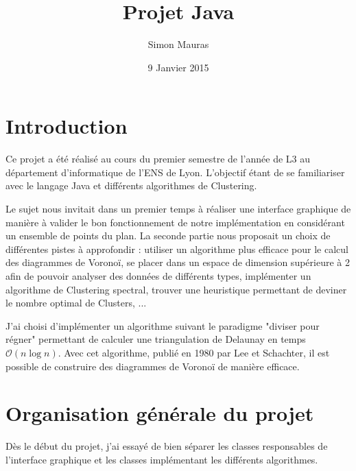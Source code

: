\documentclass[a4paper]{article}
\title{Projet Java}
\author{Simon Mauras}
\date{9 Janvier 2015}
\begin{document}
  
  \maketitle
  
  \tableofcontents

  \section{Introduction}
  
  Ce projet a été réalisé au cours du premier semestre de l'année de L3 au département d'informatique de l'ENS de Lyon. L'objectif étant de se familiariser avec le langage Java et différents algorithmes de Clustering.

Le sujet nous invitait dans un premier temps à réaliser une interface graphique de manière à valider le bon fonctionnement de notre implémentation en considérant un ensemble de points du plan. La seconde partie nous proposait un choix de différentes pistes à approfondir : utiliser un algorithme plus efficace pour le calcul des diagrammes de Voronoï, se placer dans un espace de dimension supérieure à 2 afin de pouvoir analyser des données de différents types, implémenter un algorithme de Clustering spectral, trouver une heuristique permettant de deviner le nombre optimal de Clusters, ...

J'ai choisi d'implémenter un algorithme suivant le paradigme "diviser pour régner" permettant de calculer une triangulation de Delaunay en temps $\mathcal O(n \log n)$. Avec cet algorithme, publié en 1980 par Lee et Schachter, il est possible de construire des diagrammes de Voronoï de manière efficace.

  \newpage
  
  \section{Organisation générale du projet}
  
  Dès le début du projet, j'ai essayé de bien séparer les classes responsables de l'interface graphique et les classes implémentant les différents algorithmes.
\end{document}
